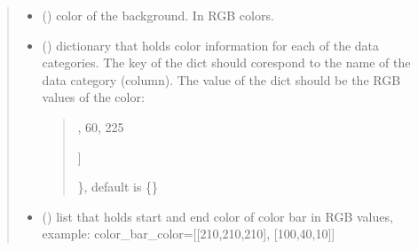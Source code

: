 \documentclass[letterpaper,10pt,english]{sphinxmanual}
\begin{document}
\begin{fulllineitems}
\begin{quote}
\begin{description}
\begin{itemize}
\item {} 
\sphinxAtStartPar
{} (\sphinxstyleliteralemphasis{\sphinxupquote{ (}}\sphinxstyleliteralemphasis{\sphinxupquote{, }}\sphinxstyleliteralemphasis{\sphinxupquote{, }}\sphinxstyleliteralemphasis{\sphinxupquote{)}}) \textendash{} color of the background. In RGB colors.

\item {} 
\sphinxAtStartPar
{} () \textendash{} 
\sphinxAtStartPar
dictionary that holds color information for each of the data categories. The key of the dict should
corespond to the name of the data category (column). The value of the dict should be the RGB values of the color:
\begin{quote}
\begin{description}
\sphinxlineitem{\{}\begin{description}
\sphinxlineitem{“United States”: {[}}
,
60,
225

\end{description}

\sphinxAtStartPar
{]}

\end{description}

\sphinxAtStartPar
\}, default is \{\}
\end{quote}


\item {} 
\sphinxAtStartPar
{} (\sphinxstyleliteralemphasis{\sphinxupquote{{[}}}\sphinxstyleliteralemphasis{\sphinxupquote{{]}}}) \textendash{} list that holds start and end color of color bar in RGB values, example: color\_bar\_color={[}{[}210,210,210{]}, {[}100,40,10{]}{]}

\end{itemize}

\end{description}\end{quote}

\end{fulllineitems}

\label{\detokenize{index:module-sjvisualizer.Canvas}}
\end{document}
